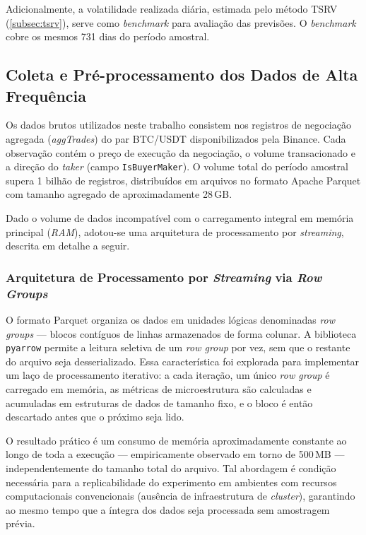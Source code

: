 Adicionalmente, a volatilidade realizada diária, estimada pelo método
TSRV (\autoref{subsec:tsrv}), serve como \emph{benchmark} para avaliação
das previsões. O \emph{benchmark} cobre os mesmos 731 dias do período
amostral.

\subsection{Coleta e Pré-processamento dos Dados de Alta Frequência}
\label{subsec:met_coleta}

Os dados brutos utilizados neste trabalho consistem nos registros de negociação agregada (\emph{aggTrades}) do par BTC/USDT disponibilizados pela Binance. Cada observação contém o preço de execução da negociação, o volume transacionado e a direção do \emph{taker} (campo \texttt{IsBuyerMaker}). O volume total do período amostral supera 1 bilhão de registros, distribuídos em arquivos no formato Apache Parquet com tamanho agregado de aproximadamente 28\,GB.

Dado o volume de dados incompatível com o carregamento integral em memória principal (\emph{RAM}), adotou-se uma arquitetura de processamento por \emph{streaming}, descrita em detalhe a seguir.

\subsubsection{Arquitetura de Processamento por \emph{Streaming} via \emph{Row Groups}}
\label{subsubsec:streaming_rg}

O formato Parquet organiza os dados em unidades lógicas denominadas \emph{row groups} --- blocos contíguos de linhas armazenados de forma colunar. A biblioteca \texttt{pyarrow} permite a leitura seletiva de um \emph{row group} por vez, sem que o restante do arquivo seja desserializado. Essa característica foi explorada para implementar um laço de processamento iterativo: a cada iteração, um único \emph{row group} é carregado em memória, as métricas de microestrutura são calculadas e acumuladas em estruturas de dados de tamanho fixo, e o bloco é então descartado antes que o próximo seja lido.

O resultado prático é um consumo de memória aproximadamente constante ao longo de toda a execução --- empiricamente observado em torno de 500\,MB --- independentemente do tamanho total do arquivo. Tal abordagem é condição necessária para a replicabilidade do experimento em ambientes com recursos computacionais convencionais (ausência de infraestrutura de \emph{cluster}), garantindo ao mesmo tempo que a íntegra dos dados seja processada sem amostragem prévia.

